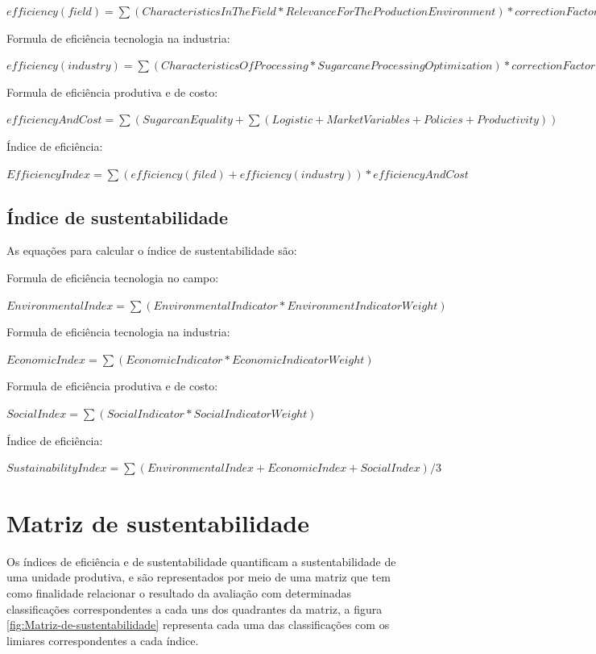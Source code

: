 $efficiency(field)=\sum(CharacteristicsInTheField*RelevanceForTheProductionEnvironment)*correctionFactor(0.8)$

Formula de eficiência tecnologia na industria:

$efficiency(industry)=\sum(CharacteristicsOfProcessing*SugarcaneProcessingOptimization)*correctionFactor(0.2)$

Formula de eficiência produtiva e de costo:

$efficiencyAndCost=\sum(SugarcanEquality+\sum(Logistic+MarketVariables+Policies+Productivity))$

Índice de eficiência:

$EfficiencyIndex=\sum(efficiency(filed)+efficiency(industry))*efficiencyAndCost$

\subsection*{Índice de sustentabilidade}

As equações para calcular o índice de sustentabilidade são:

Formula de eficiência tecnologia no campo:

$EnvironmentalIndex=\sum(EnvironmentalIndicator*EnvironmentIndicatorWeight)$

Formula de eficiência tecnologia na industria:

$EconomicIndex=\sum(EconomicIndicator*EconomicIndicatorWeight)$

Formula de eficiência produtiva e de costo:

$SocialIndex=\sum(SocialIndicator*SocialIndicatorWeight)$

Índice de eficiência:

$SustainabilityIndex=\sum(EnvironmentalIndex+EconomicIndex+SocialIndex)/3$

\section{Matriz de sustentabilidade}

Os índices de eficiência e de sustentabilidade quantificam a sustentabilidade
de uma unidade produtiva, e são representados por meio de uma matriz
que tem como finalidade relacionar o resultado da avaliação com determinadas
classificações correspondentes a cada uns dos quadrantes da matriz,
a figura \ref{fig:Matriz-de-sustentabilidade} representa cada uma
das classificações com os limiares correspondentes a cada índice.

